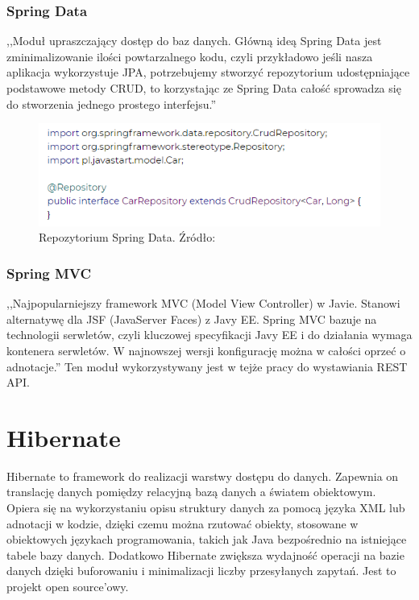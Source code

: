 \subsubsection{Spring Data}

,,Moduł upraszczający dostęp do baz danych. Główną ideą Spring Data jest zminimalizowanie ilości powtarzalnego kodu, czyli przykładowo jeśli nasza aplikacja wykorzystuje JPA, potrzebujemy stworzyć repozytorium udostępniające podstawowe metody CRUD, to korzystając ze Spring Data całość sprowadza się do stworzenia jednego prostego interfejsu.'' \cite{JavaStart-Spring}


\begin{figure}[h!]
  \centering
    \includegraphics[width=1.0\textwidth]{images/springData.PNG}
  \caption{Repozytorium Spring Data. Źródło: \cite{JavaStart-Spring}}
\end{figure}



\subsubsection{Spring MVC}

 ,,Najpopularniejszy framework MVC (Model View Controller) w Javie. Stanowi alternatywę dla JSF (JavaServer Faces) z Javy EE. Spring MVC bazuje na technologii serwletów, czyli kluczowej specyfikacji Javy EE i do działania wymaga kontenera serwletów. W najnowszej wersji konfigurację można w całości oprzeć o adnotacje.'' \cite{JavaStart-Spring} Ten moduł wykorzystywany jest w tejże pracy do wystawiania REST API.

\section{Hibernate}

Hibernate to framework do realizacji warstwy dostępu do danych. Zapewnia on translację danych pomiędzy relacyjną bazą danych a światem obiektowym. Opiera się na wykorzystaniu opisu struktury danych za pomocą języka XML lub adnotacji w kodzie, dzięki czemu można rzutować obiekty, stosowane w obiektowych językach programowania, takich jak Java bezpośrednio na istniejące tabele bazy danych. Dodatkowo Hibernate zwiększa wydajność operacji na bazie danych dzięki buforowaniu i minimalizacji liczby przesyłanych zapytań. Jest to projekt open source'owy. \cite{Hibernate}

